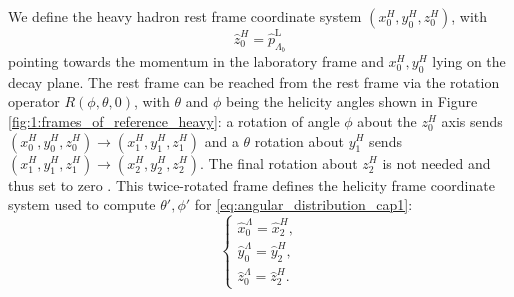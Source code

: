 We define the heavy hadron \lbz rest frame coordinate system $(x_0^H, y_0^H, z_0^H)$, with
\begin{equation}
	\hat{z}_0^H = \hat{p}_{\Lambda_b}^\text{L}
\end{equation}
pointing towards the \lbz momentum in the laboratory frame and $x_0^H, y_0^H$ lying on the \demonstratorshort decay plane.
The \slambda rest frame can be reached from the \lbz rest frame via the rotation operator $R(\phi,\theta,0)$, with $\theta$ and $\phi$ being the \lz helicity angles shown in Figure \ref{fig:1:frames_of_reference_heavy}:
a rotation of angle $\phi$ about the $z_0^H$ axis sends
$(x_0^H, y_0^H, z_0^H) \rightarrow (x_1^H, y_1^H, z_1^H)$ and a $\theta$ rotation about  $y_1^H$ sends $(x_1^H, y_1^H, z_1^H) \rightarrow (x_2^H, y_2^H, z_2^H)$.
The final rotation about $z_2^H$ is not needed and thus set to zero \cite{Richman:153636}.
This twice-rotated frame defines the \slambda helicity frame coordinate system used to compute $\theta',\phi'$ for \eqref{eq:angular_distribution_cap1}:
\begin{equation}
	\begin{cases}
		\hat{x}_0^\Lambda = \hat{x}_2^H, \\
		\hat{y}_0^\Lambda = \hat{y}_2^H, \\
		\hat{z}_0^\Lambda = \hat{z}_2^H.
	\end{cases}
\end{equation}

